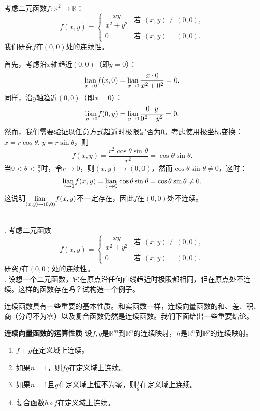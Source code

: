 \documentclass[12pt,UTF8,fontset=none]{ctexbook}
\begin{document}
\begin{ex}
考虑二元函数$f: \mathbb{R}^2 \to \mathbb{R}$：
$$ f(x, y) = \begin{cases}
\dfrac{xy}{x^2+y^2} & \text{若 } (x, y) \neq (0, 0), \\
0 & \text{若 } (x, y) = (0, 0).
\end{cases} $$
我们研究$f$在$(0, 0)$处的连续性。

首先，考虑沿$x$轴趋近$(0, 0)$（即$y=0$）：
$$ \underset{x\to 0}{\operatorname{lian}\,} f(x, 0) = \underset{x\to 0}{\operatorname{lian}\,} \frac{x \cdot 0}{x^2+0^2} = 0. $$
同样，沿$y$轴趋近$(0, 0)$（即$x=0$）：
$$ \underset{y\to 0}{\operatorname{lian}\,} f(0, y) = \underset{y\to 0}{\operatorname{lian}\,} \frac{0 \cdot y}{0^2+y^2} = 0. $$
然而，我们需要验证以任意方式趋近时极限是否为$0$。考虑使用极坐标变换：$x = r\cos\theta$, $y = r\sin\theta$，则
$$ f(x, y) = \frac{r^2\cos\theta\sin\theta}{r^2} = \cos\theta\sin\theta. $$
当$0<\theta <\displaystyle \frac{\pi}{2}$时，令$r \to 0$，则$(x,y) \to (0,0)$，然而$\cos\theta\sin\theta \neq 0$，这时：
$$ \underset{r\to 0}{\operatorname{lian}\,} f(x, y)  = \underset{r\to 0}{\operatorname{lian}\,} \cos\theta\sin\theta = \cos\theta\sin\theta \neq 0. $$
这说明$\underset{(x,y)\to(0,0)}{\operatorname{lian}\,} f(x, y)$不一定存在，因此$f$在$(0, 0)$处不连续。
\end{ex}

\begin{sk}
\mbox{}\\
. 考虑二元函数
$$ f(x, y) = \begin{cases}
\dfrac{xy}{x^2+y^2} & \text{若 } (x, y) \neq (0, 0), \\
0 & \text{若 } (x, y) = (0, 0).
\end{cases} $$
研究$f$在$(0, 0)$处的连续性。\\
. 设想一个二元函数，它在原点沿任何直线趋近时极限都相同，但在原点处不连续。这样的函数存在吗？试构造一个例子。
\end{sk}

连续函数具有一些重要的基本性质。和实函数一样，连续向量函数的和、差、积、商（分母不为零）以及复合函数仍然是连续函数。我们下面给出一些重要结论。

\begin{tm}{\textbf{连续向量函数的运算性质}}
设$f, g$是$\mathbb{R}^m$到$\mathbb{R}^n$的连续映射，$h$是$\mathbb{R}^n$到$\mathbb{R}^p$的连续映射。
\begin{enumerate}[label=\arabic*.]
\item $f \pm g$在定义域上连续。
\item 如果$n=1$，则$fg$在定义域上连续。
\item 如果$n=1$且$g$在定义域上恒不为零，则$\frac{f}{g}$在定义域上连续。
\item 复合函数$h \circ f$在定义域上连续。
\end{enumerate}
\end{tm}
\end{document}
